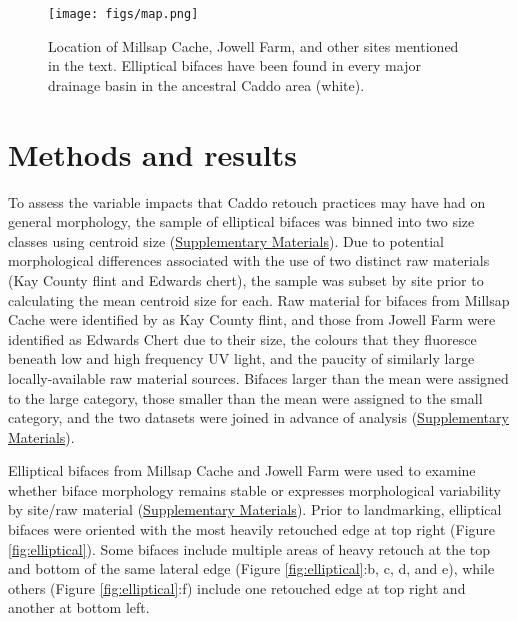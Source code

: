 \documentclass[]{interact}
\theoremstyle{plain}%
\theoremstyle{definition}
\theoremstyle{remark}
\begin{document}
\begin{figure}\centering
\texttt{[image: figs/map.png]}
\caption{Location of Millsap Cache, Jowell Farm, and other sites mentioned in the text. Elliptical bifaces have been found in every major drainage basin in the ancestral Caddo area (white).}
\label{fig:map}
\end{figure}

\hypertarget{methods-and-results}{%
\section{Methods and results}\label{methods-and-results}}

To assess the variable impacts that Caddo retouch practices may have had
on general morphology, the sample of elliptical bifaces was binned into
two size classes using centroid size
(\href{https://seldenlab.github.io/elliptical.bifaces/}{Supplementary
Materials}). Due to potential morphological differences associated with
the use of two distinct raw materials (Kay County flint and Edwards
chert), the sample was subset by site prior to calculating the mean
centroid size for each. Raw material for bifaces from Millsap Cache were
identified by \citet{RN11461} as Kay County flint, and those from Jowell
Farm were identified as Edwards Chert due to their size, the colours
that they fluoresce beneath low and high frequency UV light, and the
paucity of similarly large locally-available raw material sources.
Bifaces larger than the mean were assigned to the large category, those
smaller than the mean were assigned to the small category, and the two
datasets were joined in advance of analysis
(\href{https://seldenlab.github.io/elliptical.bifaces/}{Supplementary
Materials}).

Elliptical bifaces from Millsap Cache and Jowell Farm were used to
examine whether biface morphology remains stable or expresses
morphological variability by site/raw material
(\href{https://seldenlab.github.io/elliptical.bifaces/gm---siteraw-material.html}{Supplementary
Materials}). Prior to landmarking, elliptical bifaces were oriented with
the most heavily retouched edge at top right (Figure
\ref{fig:elliptical}). Some bifaces include multiple areas of heavy
retouch at the top and bottom of the same lateral edge (Figure
\ref{fig:elliptical}:b, c, d, and e), while others (Figure
\ref{fig:elliptical}:f) include one retouched edge at top right and
another at bottom left.
\end{document}
